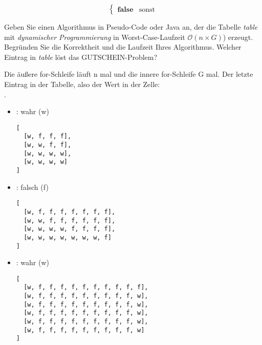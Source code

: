 \documentclass{lehramt-informatik-aufgabe}
\begin{document}
\begin{enumerate}
\begin{liAntwort}
\begin{equation*}
\begin{cases}
\textbf{false} & \text{sonst}
\end{cases}
\end{equation*}
\end{liAntwort}

Geben Sie einen Algorithmus in Pseudo-Code oder Java an, der die Tabelle
\emph{table} mit \emph{dynamischer Programmierung} in
Worst-Case-Laufzeit $\mathcal{O}(n \times G)$) erzeugt. Begründen Sie
die Korrektheit und die Laufzeit Ihres Algorithmus. Welcher Eintrag in
\emph{table} löst das GUTSCHEIN-Problem?

\begin{liAntwort}

Die äußere for-Schleife läuft n mal und die innere for-Schleife G mal.
Der letzte Eintrag in der Tabelle, also der Wert in der Zelle:\\
.

\end{liAntwort}


\begin{itemize}
\item {}: wahr (w)

\begin{verbatim}
[
  [w, f, f, f],
  [w, w, f, f],
  [w, w, w, w],
  [w, w, w, w]
]
\end{verbatim}

\item {}: falsch (f)

\begin{verbatim}
[
  [w, f, f, f, f, f, f, f],
  [w, w, f, f, f, f, f, f],
  [w, w, w, w, f, f, f, f],
  [w, w, w, w, w, w, w, f]
]
\end{verbatim}

\item {}: wahr (w)

\begin{verbatim}
[
  [w, f, f, f, f, f, f, f, f, f, f],
  [w, f, f, f, f, f, f, f, f, f, w],
  [w, f, f, f, f, f, f, f, f, f, w],
  [w, f, f, f, f, f, f, f, f, f, w],
  [w, f, f, f, f, f, f, f, f, f, w],
  [w, f, f, f, f, f, f, f, f, f, w]
]
\end{verbatim}
\end{itemize}

\end{enumerate}
\end{document}
